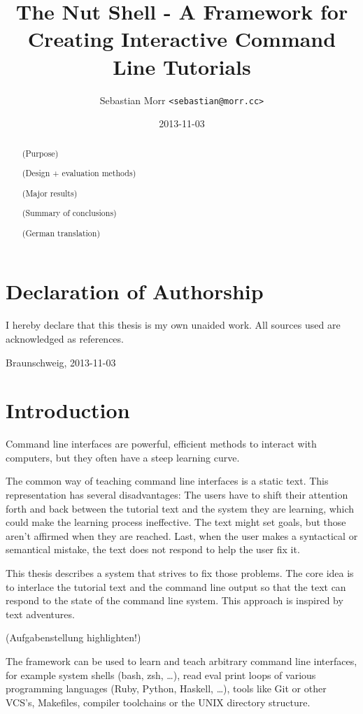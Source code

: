 \documentclass[twoside,parskip]{scrreprt}
\title{The Nut Shell - A Framework for Creating Interactive Command Line Tutorials}
\author{Sebastian Morr \texttt{<sebastian@morr.cc>}}
\date{2013-11-03}
\begin{document}
\maketitle

\chapter*{Declaration of Authorship}

I hereby declare that this thesis is my own unaided work. All sources used are acknowledged as references.

Braunschweig, 2013-11-03 \dotfill

\begin{abstract}
    (Purpose)

    (Design + evaluation methods)

    (Major results)

    (Summary of conclusions)

    \vspace{8em}

    (German translation)
\end{abstract}

\setcounter{tocdepth}{1}
\tableofcontents

\chapter{Introduction}

Command line interfaces are powerful, efficient methods to interact with computers, but they often have a steep learning curve.

The common way of teaching command line interfaces is a static text. This representation has several disadvantages: The users have to shift their attention forth and back between the tutorial text and the system they are learning, which could make the learning process ineffective. The text might set goals, but those aren't affirmed when they are reached. Last, when the user makes a syntactical or semantical mistake, the text does not respond to help the user fix it.

This thesis describes a system that strives to fix those problems. The core idea is to interlace the tutorial text and the command line output so that the text can respond to the state of the command line system. This approach is inspired by text adventures.

(Aufgabenstellung highlighten!)

The framework can be used to learn and teach arbitrary command line interfaces, for example system shells (bash, zsh, …), read eval print loops of various programming languages (Ruby, Python, Haskell, …), tools like Git or other VCS's, Makefiles, compiler toolchains or the UNIX directory structure.
\end{document}

